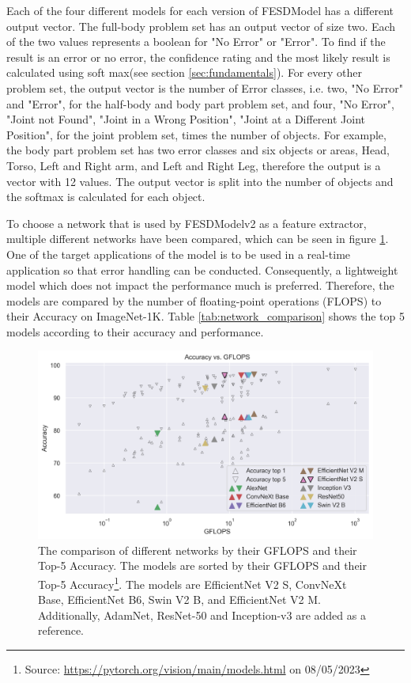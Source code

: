 Each of the four different models for each version of FESDModel has a different output vector. The full-body problem set has an output vector of size two. Each of the two values represents a boolean for "No Error" or "Error". To find if the result is an error or no error, the confidence rating and the most likely result is calculated using soft max(see section \ref{sec:fundamentals}). For every other problem set, the output vector is the number of Error classes, i.e. two, "No Error" and "Error", for the half-body and body part problem set, and four, "No Error", "Joint not Found", "Joint in a Wrong Position", "Joint at a Different Joint Position", for the joint problem set, times the number of objects. For example, the body part problem set has two error classes and six objects or areas, Head, Torso, Left and Right arm, and Left and Right Leg, therefore the output is a vector with 12 values. The output vector is split into the number of objects and the softmax is calculated for each object. 

To choose a network that is used by FESDModelv2 as a feature extractor, multiple different networks have been compared, which can be seen in figure \ref{fig:network_comparison}. One of the target applications of the model is to be used in a real-time application so that error handling can be conducted. Consequently, a lightweight model which does not impact the performance much is preferred. Therefore, the models are compared by the number of floating-point operations (FLOPS) to their Accuracy on ImageNet-1K. Table \ref{tab:network_comparison} shows the top 5 models according to their accuracy and performance. 

\begin{figure}[ht]
  \centering
  \includegraphics[width=\linewidth]{figures/network/networks.png}
  \caption[Network comparison]{The comparison of different networks by their GFLOPS and their Top-5 Accuracy. The models are sorted by their GFLOPS and their Top-5 Accuracy\footnote{Source: \url{https://pytorch.org/vision/main/models.html} on 08/05/2023}. The models are EfficientNet V2 S, ConvNeXt Base, EfficientNet B6, Swin V2 B, and EfficientNet V2 M. Additionally, AdamNet, ResNet-50 and Inception-v3 are added as a reference.}
  \label{fig:network_comparison}
\end{figure}

